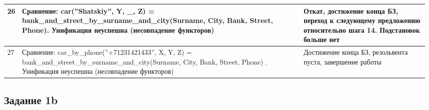 \documentclass[12pt]{report}
\begin{document}
\begin{table}[H]
\begin{center}
\begin{tabular}{|p{1 cm}|p{11 cm}|p{7 cm}|}
			\hline
			26 & Сравнение: \newline car(''Shatskiy'', Y, \_, Z) = \newline bank\_and\_street\_by\_surname\_and\_city(Surname, City, Bank, Street, Phone). \newline Унификация неуспешна (несовпадение функторов) & Откат, достижение конца БЗ, переход к следующему предложению относительно шага 14. Подстановок больше нет \\
			\hline
			27 & Сравнение: \newline car\_by\_phone(''+71231421433'', X, Y, Z) = \newline bank\_and\_street\_by\_surname\_and\_city(Surname, City, Bank, Street, Phone) . \newline Унификация неуспешна (несовпадение функторов) & Достижение конца БЗ, резольвента пуста, завершение работы \\
			\hline
		\end{tabular}
	\end{center}
\end{table}

\subsection*{Задание 1b}
\end{document}

